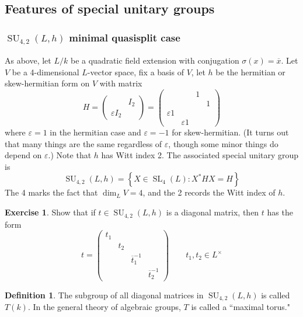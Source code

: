 \documentclass[12pt]{article}
\theoremstyle{definition}
\newtheorem{definition}[theorem]{Definition}
\newtheorem{exercise}[theorem]{Exercise}
\numberwithin{theorem}{subsection}
\newcommand{\sig}{\sigma}
\newcommand{\eps}{\varepsilon}
\newcommand{\lb}{\left\{}
\newcommand{\rb}{\right\}}
\newcommand{\inv}{^{-1}}
\newcommand{\ov}{\overline}
\DeclareMathOperator{\SL}{SL}
\DeclareMathOperator{\SU}{SU}
\begin{document}
\subsection{Features of special unitary groups}

\subsubsection{$\SU_{4,2}(L,h)$ minimal quasisplit case}
\label{SU4 maximal}

As above, let $L/k$ be a quadratic field extension with conjugation $\sig(x) = \ov x$. Let $V$ be a 4-dimensional $L$-vector space, fix a basis of $V$, let $h$ be the hermitian or skew-hermitian form on $V$ with matrix
\[
	H =
	\begin{pmatrix}
		& I_2 \\
		\eps I_2
	\end{pmatrix}
	=
	\begin{pmatrix}
		&& 1 \\
		&&& 1 \\
		\eps 1 \\	
		& \eps 1
	\end{pmatrix}
\]
where $\eps = 1$ in the hermitian case and $\eps = -1$ for skew-hermitian. (It turns out that many things are the same regardless of $\eps$, though some minor things do depend on $\eps$.) Note that $h$ has Witt index 2. The associated special unitary group is
\[
	\SU_{4,2}(L,h) = \lb X \in \SL_4(L) : X^*H X = H \rb
\]
The 4 marks the fact that $\dim_L V = 4$, and the 2 records the Witt index of $h$.

\begin{exercise}
\label{diagonal in SU4}
Show that if $t \in \SU_{4,2}(L,h)$ is a diagonal matrix, then $t$ has the form
\[
	t = 
	\begin{pmatrix}
		t_1 \\
		& t_2 \\
		&& \ov t_1 \inv \\
		&&& \ov t_2 \inv
	\end{pmatrix}
	\qquad t_1, t_2 \in L^\times
\]
\end{exercise}

\begin{definition}
The subgroup of all diagonal matrices in $\SU_{4,2}(L,h)$ is called $T(k)$. In the general theory of algebraic groups, $T$ is called a ``maximal torus."
\end{definition}
\end{document}

